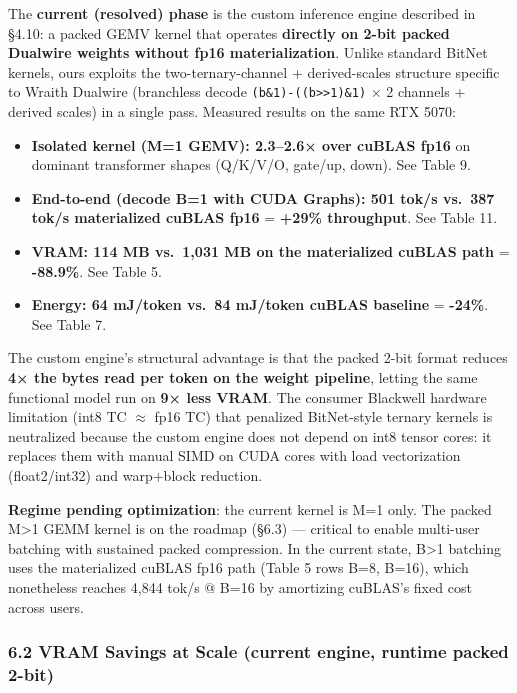 The \textbf{current (resolved) phase} is the custom inference engine
described in §4.10: a packed GEMV kernel that operates \textbf{directly
on 2-bit packed Dualwire weights without fp16 materialization}. Unlike
standard BitNet kernels, ours exploits the two-ternary-channel +
derived-scales structure specific to Wraith Dualwire (branchless decode
\texttt{(b\&1)-((b\textgreater{}\textgreater{}1)\&1)} × 2 channels +
derived scales) in a single pass. Measured results on the same RTX 5070:

\begin{itemize}
\tightlist
\item
  \textbf{Isolated kernel (M=1 GEMV): 2.3--2.6× over cuBLAS fp16} on
  dominant transformer shapes (Q/K/V/O, gate/up, down). See Table 9.
\item
  \textbf{End-to-end (decode B=1 with CUDA Graphs): 501 tok/s vs.~387
  tok/s materialized cuBLAS fp16} = \textbf{+29\% throughput}. See Table
  11.
\item
  \textbf{VRAM: 114 MB vs.~1,031 MB on the materialized cuBLAS path} =
  \textbf{-88.9\%}. See Table 5.
\item
  \textbf{Energy: 64 mJ/token vs.~84 mJ/token cuBLAS baseline} =
  \textbf{-24\%}. See Table 7.
\end{itemize}

The custom engine's structural advantage is that the packed 2-bit format
reduces \textbf{4× the bytes read per token on the weight pipeline},
letting the same functional model run on \textbf{9× less VRAM}. The
consumer Blackwell hardware limitation (int8 TC \(\approx\) fp16 TC)
that penalized BitNet-style ternary kernels is neutralized because the
custom engine does not depend on int8 tensor cores: it replaces them
with manual SIMD on CUDA cores with load vectorization (float2/int32)
and warp+block reduction.

\textbf{Regime pending optimization}: the current kernel is M=1 only.
The packed M\textgreater1 GEMM kernel is on the roadmap (§6.3) ---
critical to enable multi-user batching with sustained packed
compression. In the current state, B\textgreater1 batching uses the
materialized cuBLAS fp16 path (Table 5 rows B=8, B=16), which
nonetheless reaches 4,844 tok/s @ B=16 by amortizing cuBLAS's fixed cost
across users.

\subsubsection{6.2 VRAM Savings at Scale (current engine, runtime packed
2-bit)}\label{vram-savings-at-scale-current-engine-runtime-packed-2-bit}

